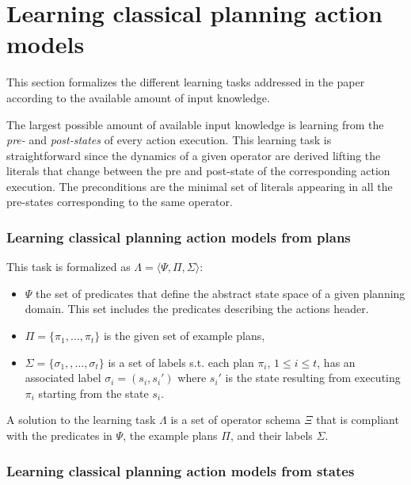 \documentclass[letterpaper]{article} %
\newcommand{\tup}[1]{{\langle #1 \rangle}}
\begin{document}
\section{Learning classical planning action models}
This section formalizes the different learning tasks addressed in the paper according to the available amount of input knowledge.

The largest possible amount of available input knowledge is learning from the {\em pre-} and {\em post-states} of every action execution. This learning task is straightforward since the dynamics of a given operator are derived lifting the literals that change between the pre and post-state of the corresponding action execution. The preconditions are the minimal set of literals appearing in all the pre-states corresponding to the same operator.

\subsubsection{Learning classical planning action models from plans}
This task is formalized as $\Lambda=\tup{\Psi,\Pi,\Sigma}$: 
\begin{itemize}
\item $\Psi$ the set of predicates that define the abstract state space of a given planning domain. This set includes the predicates describing the actions header.
\item $\Pi=\{\pi_1,\ldots,\pi_t\}$ is the given set of example plans,
\item $\Sigma=\{\sigma_1,,\ldots,\sigma_t\}$ is a set of labels s.t. each plan $\pi_i$, {\small $1\leq i\leq t$}, has an associated label $\sigma_i=(s_i,s_i')$ where $s_i'$ is the state resulting from executing $\pi_i$ starting from the state $s_i$. 
\end{itemize}

A solution to the learning task $\Lambda$ is a set of operator schema $\Xi$ that is compliant with the predicates in $\Psi$, the example plans $\Pi$, and their labels $\Sigma$.


\subsubsection{Learning classical planning action models from states}
\end{document}
